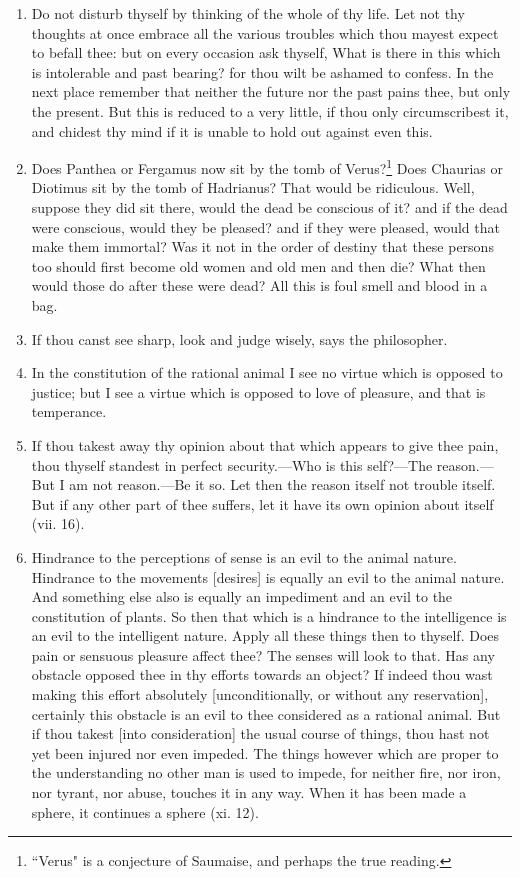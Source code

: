 \begin{enumerate}
\item Do not disturb thyself by thinking of the whole of thy life. Let not thy thoughts at once embrace all the various troubles which thou mayest expect to befall thee: but on every occasion ask thyself, What is there in this which is intolerable and past bearing? for thou wilt be ashamed to confess. In the next place remember that neither the future nor the past pains thee, but only the present. But this is reduced to a very little, if thou only circumscribest it, and chidest thy mind if it is unable to hold out against even this.

\item Does Panthea or Fergamus now sit by the tomb of Verus?\footnote{``Verus" is a conjecture of Saumaise, and perhaps the true reading.} Does Chaurias or Diotimus sit by the tomb of Hadrianus? That would be ridiculous. Well, suppose they did sit there, would the dead be conscious of it? and if the dead were conscious, would they be pleased? and if they were pleased, would that make them immortal? Was it not in the order of destiny that these persons too should first become old women and old men and then die? What then would those do after these were dead? All this is foul smell and blood in a bag.

\item If thou canst see sharp, look and judge wisely, says the philosopher.

\item In the constitution of the rational animal I see no virtue which is opposed to justice; but I see a virtue which is opposed to love of pleasure, and that is temperance.

\item If thou takest away thy opinion about that which appears to give thee pain, thou thyself standest in perfect security.—Who is this self?—The reason.—But I am not reason.—Be it so. Let then the reason itself not trouble itself. But if any other part of thee suffers, let it have its own opinion about itself (vii. 16).

\item Hindrance to the perceptions of sense is an evil to the animal nature. Hindrance to the movements [{\clarify desires}] is equally an evil to the animal nature. And something else also is equally an impediment and an evil to the constitution of plants. So then that which is a hindrance to the intelligence is an evil to the intelligent nature. Apply all these things then to thyself. Does pain or sensuous pleasure affect thee? The senses will look to that. Has any obstacle opposed thee in thy efforts towards an object? If indeed thou wast making this effort absolutely [{\clarify unconditionally, or without any reservation}], certainly this obstacle is an evil to thee considered as a rational animal. But if thou takest [{\clarify into consideration}] the usual course of things, thou hast not yet been injured nor even impeded. The things however which are proper to the understanding no other man is used to impede, for neither fire, nor iron, nor tyrant, nor abuse, touches it in any way. When it has been made a sphere, it continues a sphere (xi. 12).


\end{enumerate}
